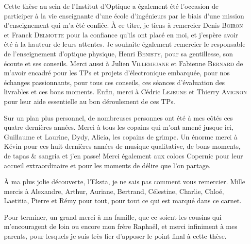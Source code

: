 Cette thèse au sein de l'Institut d'Optique a également été l'occasion de participer à la vie enseignante d'une école d'ingénieurs par le biais d'une mission d'enseignement qui m'a été confiée. À ce titre, je tiens à remercier Denis \textsc{Boiron} et Franck \textsc{Delmotte} pour la confiance qu'ils ont placé en moi, et j'espère avoir été à la hauteur de leurs attentes. Je souhaite également remercier le responsable de l'enseignement d'optique physique, Henri \textsc{Benisty}, pour sa gentillesse, son écoute et ses conseils. Merci aussi à Julien \textsc{Villemejane} et Fabienne \textsc{Bernard} de m'avoir encadré pour les TPs et projets d'électronique embarquée, pour nos échanges passionnants, pour tous ces conseils, ces séances d'évaluation des livrables et ces bons moments. Enfin, merci à Cédric \textsc{Lejeune} et Thierry \textsc{Avignon} pour leur aide essentielle au bon déroulement de ces TPs.

Sur un plan plus personnel, de nombreuses personnes ont été à mes côtés ces quatre dernières années. Merci à tous les copains qui m'ont amené jusque ici, Guillaume et Laurine, Dydy, Alicia, les copains de grimpe. Un énorme merci à Kévin pour ces huit dernières années de musique qualitative, de bons moments, de tapas \& sangria et j'en passe! Merci également aux colocs Copernic pour leur accueil extraordinaire et pour les moments de délire que l'on partage. 

À ma plus jolie découverte, l'Eksta, je ne sais pas comment vous remercier. Mille mercis à Alexandre, Arthur, Auriane, Bertrand, Célestine, Charlie, Chloé, Laetitia, Pierre et Rémy pour tout, pour tout ce qui est marqué dans ce carnet. 

Pour terminer, un grand merci à ma famille, que ce soient les cousins qui m'encouragent de loin ou encore mon frère Raphaël, et merci infiniment à mes parents, pour lesquels je suis très fier d'apposer le point final à cette thèse.





